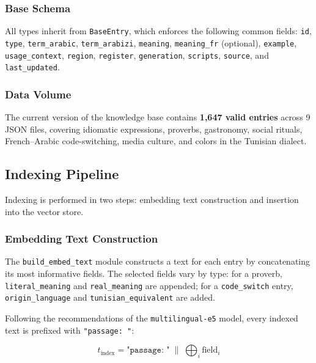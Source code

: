 \subsubsection{Base Schema}

All types inherit from \texttt{BaseEntry}, which enforces the following common fields:
\texttt{id}, \texttt{type}, \texttt{term\_arabic}, \texttt{term\_arabizi}, \texttt{meaning},
\texttt{meaning\_fr} (optional), \texttt{example}, \texttt{usage\_context},
\texttt{region}, \texttt{register}, \texttt{generation}, \texttt{scripts},
\texttt{source}, and \texttt{last\_updated}.

\subsubsection{Data Volume}

The current version of the knowledge base contains \textbf{1,647 valid entries}
across 9 JSON files, covering idiomatic expressions, proverbs, gastronomy, social
rituals, French--Arabic code-switching, media culture, and colors in the Tunisian dialect.

\subsection{Indexing Pipeline}
\label{subsec:indexing}

Indexing is performed in two steps: embedding text construction and insertion into
the vector store.

\subsubsection{Embedding Text Construction}

The \texttt{build\_embed\_text} module constructs a text for each entry by concatenating
its most informative fields. The selected fields vary by type: for a proverb,
\texttt{literal\_meaning} and \texttt{real\_meaning} are appended; for a
\texttt{code\_switch} entry, \texttt{origin\_language} and \texttt{tunisian\_equivalent}
are added.

Following the recommendations of the \texttt{multilingual-e5} model, every indexed
text is prefixed with \texttt{"passage: "}:

\begin{equation}
    t_{\text{index}} = \texttt{"passage: "} \;\|\; \bigoplus_{i} \text{field}_i
    \label{eq:passage_prefix}
\end{equation}

